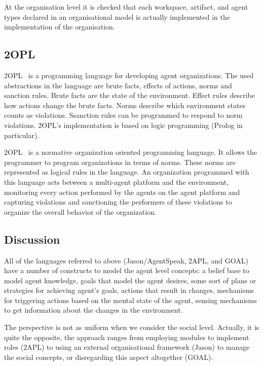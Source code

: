 \documentclass[a4paper,12pt,oneside,fleqn]{book} %
\begin{document}
At the organisation level it is checked that each workspace, artifact, and
agent types declared in an organisational model is actually implemented in
the implementation of the organisation.

\subsection{2OPL} %

2OPL~\cite{} is a programming language for developing agent organizations.
The used abstractions in the language are brute facts, effects of actions,
norms and sanction rules. Brute facts are the state of the environment.
Effect rules describe how actions change the brute facts. Norms describe
which environment states counts as violations. Ssanction rules can be
programmed to respond to norm violations. 2OPL's implementation is based on
logic programming (Prolog in particular).

2OPL~\cite{} is a normative organization oriented programming
language. It allows the programmer to program organizations in terms of
norms. These norms are represented as logical rules in the language. An
organization programmed with this language acts between a multi-agent
platform and the environment, monitoring every action performed by the
agents on the agent platform and capturing violations and sanctioning the
performers of these violations to organize the overall behavior of the
organization.

\subsection{Discussion} %

All of the languages referred to above (Jason/AgentSpeak, 2APL, and GOAL)
have a number of constructs to model the agent level concepts: a belief
base to model agent knowledge, goals that model the agent desires, some
sort of plans or strategies for achieving agent's goals, actions that
result in changes, mechanisms for triggering actions based on the mental
state of the agent, sensing mechanisms to get information about the changes
in the environment.

The perspective is not as uniform when we consider the social level.
Actually, it is quite the opposite, the approach ranges from employing
modules to implement roles (2APL) to using an external organisational framework
(Jason) to manage the social concepts, or disregarding this aspect
altogether (GOAL).
\end{document}
